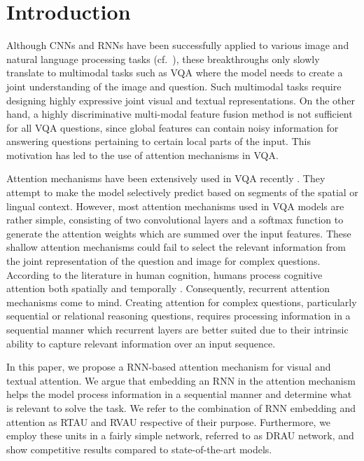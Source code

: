 \documentclass[times,twocolumn, final ,authoryear]{elsarticle}
\begin{document}
  		

  \section{Introduction}
  \label{sec1}
  Although \acp{CNN} and \acp{RNN}
  have been successfully applied to various image and natural language processing tasks (cf.\ \cite{he2015, BosTIP18, bahdanau2014, nallapati2016abstractive}), these breakthroughs only slowly translate to multimodal tasks such as \ac{VQA} where the model needs to create a joint understanding of the image and question. Such multimodal tasks require designing highly expressive joint visual and textual representations. On the other hand, a highly discriminative multi-modal feature fusion method is not sufficient for all VQA questions, since global features can contain noisy information for answering questions pertaining to certain local parts of the input. This motivation has led to the use of attention mechanisms in VQA.
  
  
  Attention mechanisms have been extensively used in VQA recently \citep{anderson2017, fukui2016, kim2016b}. They attempt to make the model selectively predict based on segments of the spatial or lingual context. However, most attention mechanisms used in VQA models are rather simple, consisting of two convolutional layers and a softmax function to generate the attention weights which are summed over the input features. These shallow attention mechanisms could fail to select the relevant information from the joint representation of the question and image for complex questions. According to the literature in human cognition, humans process cognitive attention both spatially and temporally \citep{rensink2000}. Consequently, recurrent attention mechanisms come to mind. Creating attention for complex questions, particularly sequential or relational reasoning questions, requires processing information in a sequential manner which recurrent layers are better suited due to their intrinsic ability to capture relevant information over an input sequence.
  
  
  In this paper, we propose a \ac{RNN}-based attention mechanism for visual and textual attention. We argue that embedding an RNN in the attention mechanism helps the model process information in a sequential manner and determine what is relevant to solve the task. We refer to the combination of RNN embedding and attention as  \ac{RTAU} and \ac{RVAU} respective of their purpose. Furthermore, we employ these units in a fairly simple network, referred to as \ac{DRAU} network, and show competitive results compared to state-of-the-art models. 
  
\end{document}
